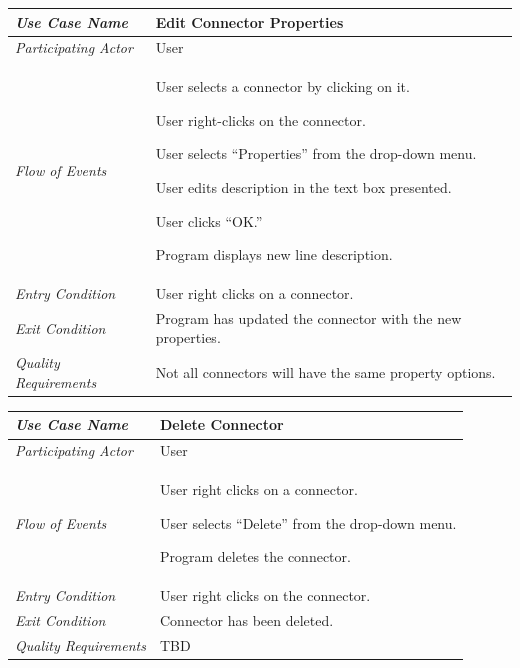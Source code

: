 \documentclass[twoside,letterpaper]{article}
\newenvironment{my_enumerate}{
\begin{enumerate}
  \setlength{\itemsep}{1pt}
  \setlength{\parskip}{0pt}
  \setlength{\parsep}{0pt}}{\end{enumerate}
}
\begin{document}
\begin{flushleft}
\tablehead{}
\begin{tabular}{|m{2.0in} m{5.0in}|}
\hline {\bfseries\emph{Use Case Name}}
& {\bfseries Edit Connector Properties}
\\\hline
\emph{Participating Actor}
& User
\\\hline
\emph{Flow of Events}
& 
\begin{my_enumerate}
\item User selects a connector by clicking on it.
\item User right-clicks on the connector.
\item User selects ``Properties'' from the drop-down menu.
\item User edits description in the text box presented.
\item User clicks ``OK.''
\item Program displays new line description.
\end{my_enumerate}
\\\hline
\emph{Entry Condition}
& User right clicks on a connector.
\\\hline
\emph{Exit Condition}
& Program has updated the connector with the new properties.
\\\hline
\emph{Quality Requirements}
& Not all connectors will have the same property options.
\\\hline
\end{tabular}
\end{flushleft}
\bigskip


\begin{flushleft}
\tablehead{}
\begin{tabular}{|m{2.0in} m{5.0in}|}
\hline {\bfseries\emph{Use Case Name}}
& {\bfseries Delete Connector}
\\\hline
\emph{Participating Actor}
& User
\\\hline
\emph{Flow of Events}
& \begin{my_enumerate}
\item User right clicks on a connector.
\item User selects ``Delete'' from the drop-down menu.
\item Program deletes the connector.
\end{my_enumerate}
\\\hline
\emph{Entry Condition}
& User right clicks on the connector.
\\\hline
\emph{Exit Condition}
& Connector has been deleted.
\\\hline
\emph{Quality Requirements}
& TBD
\\\hline
\end{tabular}
\end{flushleft}
\bigskip
\end{document}
